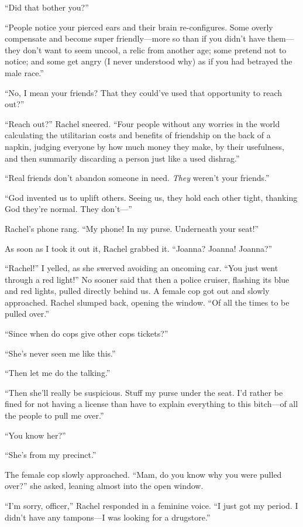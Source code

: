 ``Did that bother you?''

``People notice your pierced ears and their brain re-configures. Some
overly compensate and become super friendly---more so than if you didn't
have them---they don't want to seem uncool, a relic from another age;
some pretend not to notice; and some get angry (I never understood why)
as if you had betrayed the male race.''

``No, I mean your friends? That they could've used that opportunity to
reach out?''

``Reach out?'' Rachel sneered. ``Four people without any worries in the
world calculating the utilitarian costs and benefits of friendship on
the back of a napkin, judging everyone by how much money they make, by
their usefulness, and then summarily discarding a person just like a
used dishrag.''

``Real friends don't abandon someone in need. \emph{They} weren't your
friends.''

``God invented us to uplift others. Seeing us, they hold each other
tight, thanking God they're normal. They don't---''

Rachel's phone rang. ``My phone! In my purse. Underneath your seat!''

As soon as I took it out it, Rachel grabbed it. ``Joanna? Joanna!
Joanna?''

``Rachel!'' I yelled, as she swerved avoiding an oncoming car. ``You
just went through a red light!'' No sooner said that then a police
cruiser, flashing its blue and red lights, pulled directly behind us. A
female cop got out and slowly approached. Rachel slumped back, opening
the window. ``Of all the times to be pulled over.''

``Since when do cops give other cops tickets?''

``She's never seen me like this.''

``Then let me do the talking.''

``Then she'll really be suspicious. Stuff my purse under the seat. I'd
rather be fined for not having a license than have to explain everything
to this bitch---of all the people to pull me over.''

``You know her?''

``She's from my precinct.''

The female cop slowly approached. ``Mam, do you know why you were pulled
over?'' she asked, leaning almost into the open window.

``I'm sorry, officer,'' Rachel responded in a feminine voice. ``I just
got my period. I didn't have any tampons---I was looking for a
drugstore.''

